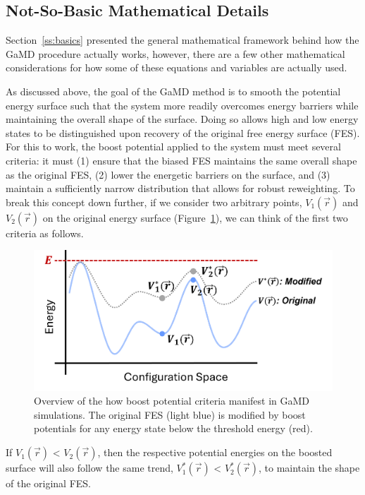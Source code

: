 \documentclass[9pt,tutorial,pubversion]{livecoms}
\begin{document}
\subsection{Not-So-Basic Mathematical Details} \label{ss:notsobasics}
Section~\ref{ss:basics} presented the general mathematical framework behind how the GaMD procedure actually works, however, there are a few other mathematical considerations for how some of these equations and variables are actually used. 

As discussed above, the goal of the GaMD method is to smooth the potential energy surface such that the system more readily overcomes energy barriers while maintaining the overall shape of the surface. Doing so allows high and low energy states to be distinguished upon recovery of the original free energy surface (FES). For this to work, the boost potential applied to the system must meet several criteria: it must (1) ensure that the biased FES maintains the same overall shape as the original FES, (2) lower the energetic barriers on the surface, and (3) maintain a sufficiently narrow distribution that allows for robust reweighting. To break this concept down further, if we consider two arbitrary points, $V_{1}(\vec{r})$ and $V_{2}(\vec{r})$ on the original energy surface (Figure~\ref{fig:criteria12}), we can think of the first two criteria as follows. 

\bigskip
\begin{figure}[h] 
    \includegraphics[width=\columnwidth]{main_figs/criteria1_2.png}
    \caption{Overview of the how boost potential criteria manifest in GaMD simulations. The original FES (light blue) is modified by boost potentials for any energy state below the threshold energy (red).}
    \label{fig:criteria12}
\end{figure}

If $V_{1}(\vec{r})$ < $V_{2}(\vec{r})$, then the respective potential energies on the boosted surface will also follow the same trend, $V_{1}^{*}(\vec{r})$ < $V_{2}^{*}(\vec{r})$, to maintain the shape of the original FES. 
\end{document}
